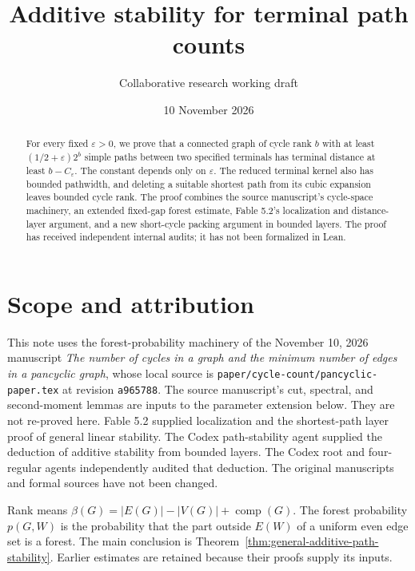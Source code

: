 \documentclass[11pt]{article}
\title{Additive stability for terminal path counts}
\author{Collaborative research working draft}
\date{10 November 2026}
\begin{document}
\maketitle
\begin{abstract}
For every fixed $\varepsilon>0$, we prove that a connected graph of cycle rank $b$ with at least $(1/2+\varepsilon)2^b$ simple paths between two specified terminals has terminal distance at least $b-C_\varepsilon$.
The constant depends only on $\varepsilon$.
The reduced terminal kernel also has bounded pathwidth, and deleting a suitable shortest path from its cubic expansion leaves bounded cycle rank.
The proof combines the source manuscript's cycle-space machinery, an extended fixed-gap forest estimate, Fable 5.2's localization and distance-layer argument, and a new short-cycle packing argument in bounded layers.
The proof has received independent internal audits; it has not been formalized in Lean.
\end{abstract}

\section*{Scope and attribution}
This note uses the forest-probability machinery of the November 10, 2026 manuscript
\emph{The number of cycles in a graph and the minimum number of edges in a pancyclic graph},
whose local source is \nolinkurl{paper/cycle-count/pancyclic-paper.tex} at revision \texttt{a965788}.
The source manuscript's cut, spectral, and second-moment lemmas are inputs to the parameter extension below.
They are not re-proved here.
Fable 5.2 supplied localization and the shortest-path layer proof of general linear stability.
The Codex path-stability agent supplied the deduction of additive stability from bounded layers.
The Codex root and four-regular agents independently audited that deduction.
The original manuscripts and formal sources have not been changed.

Rank means $\beta(G)=|E(G)|-|V(G)|+\operatorname{comp}(G)$.
The forest probability $p(G,W)$ is the probability that the part outside $E(W)$ of a uniform even edge set is a forest.
The main conclusion is Theorem~\ref{thm:general-additive-path-stability}.
Earlier estimates are retained because their proofs supply its inputs.

\tableofcontents



\end{document}
